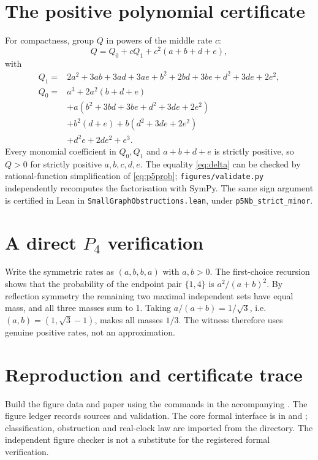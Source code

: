 \documentclass[11pt,a4paper]{article}
\begin{document}
\section{The positive polynomial certificate}\label{app:polynomial}
For compactness, group $Q$ in powers of the middle rate $c$:
\[Q=Q_0+cQ_1+c^2(a+b+d+e),\]
with
\begin{align*}
Q_1={}&2a^2+3ab+3ad+3ae+b^2+2bd+3be+d^2+3de+2e^2,\\
Q_0={}&a^3+2a^2(b+d+e)\\
&+a(b^2+3bd+3be+d^2+3de+2e^2)\\
&+b^2(d+e)+b(d^2+3de+2e^2)\\
&+d^2e+2de^2+e^3.
\end{align*}
Every monomial coefficient in $Q_0,Q_1$ and $a+b+d+e$ is strictly positive, so $Q>0$ for strictly positive $a,b,c,d,e$.  The equality \eqref{eq:delta} can be checked by rational-function simplification of \eqref{eq:p5prob}; \texttt{figures/validate.py} independently recomputes the factorisation with SymPy.  The same sign argument is certified in Lean in \texttt{SmallGraphObstructions.lean}, under \texttt{p5Nb\_strict\_minor}.

\section{A direct $P_4$ verification}\label{app:witnesses}
Write the symmetric rates as $(a,b,b,a)$ with $a,b>0$.  The first-choice recursion shows that the probability of the endpoint pair $\{1,4\}$ is $a^2/(a+b)^2$.  By reflection symmetry the remaining two maximal independent sets have equal mass, and all three masses sum to 1.  Taking $a/(a+b)=1/\sqrt3$, i.e. $(a,b)=(1,\sqrt3-1)$, makes all masses $1/3$.  The witness therefore uses genuine positive rates, not an approximation.

\section{Reproduction and certificate trace}\label{app:reproduce}
Build the figure data and paper using the commands in the accompanying . The figure ledger records sources and validation. The core formal interface is in  and ; classification, obstruction and real-clock law are imported from the  directory. The independent figure checker is not a substitute for the registered formal verification.



\end{document}
